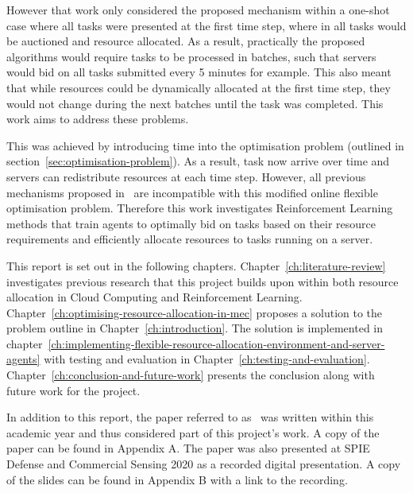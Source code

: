 However that work only considered the proposed mechanism within a one-shot case where all tasks were presented
at the first time step, where in all tasks would be auctioned and resource allocated. As a result, practically the proposed
algorithms would require tasks to be processed in batches, such that servers would bid on all tasks submitted every 5
minutes for example. This also meant that while resources could be dynamically allocated at the first time step, they
would not change during the next batches until the task was completed. This work aims to address these problems.

This was achieved by introducing time into the optimisation problem (outlined in section~\ref{sec:optimisation-problem}).
As a result, task now arrive over time and servers can redistribute resources at each time step. However, all
previous mechanisms proposed in~\cite{FlexibleResourceAllocation} are incompatible with this modified online flexible
optimisation problem. Therefore this work investigates Reinforcement Learning methods that train agents to optimally
bid on tasks based on their resource requirements and efficiently allocate resources to tasks running on a server.

This report is set out in the following chapters. Chapter~\ref{ch:literature-review} investigates previous research
that this project builds upon within both resource allocation in Cloud Computing and Reinforcement Learning.
Chapter~\ref{ch:optimising-resource-allocation-in-mec} proposes a solution to the problem outline in
Chapter~\ref{ch:introduction}.
The solution is implemented in chapter~\ref{ch:implementing-flexible-resource-allocation-environment-and-server-agents} with testing and
evaluation in Chapter~\ref{ch:testing-and-evaluation}.
Chapter~\ref{ch:conclusion-and-future-work} presents the conclusion along with future work for the project.

In addition to this report, the paper referred to as~\cite{FlexibleResourceAllocation} was written within this
academic year and thus considered part of this project's work. A copy of the paper can be found in
Appendix A. The paper was also presented at SPIE Defense and Commercial Sensing 2020 as a recorded digital presentation.
A copy of the slides can be found in Appendix B with a link to the recording.
